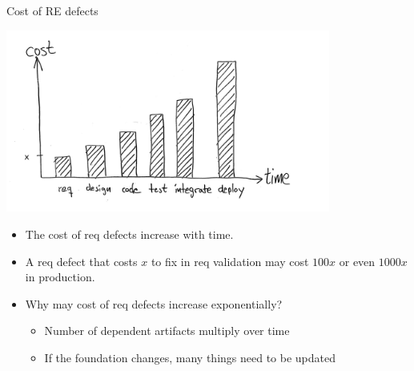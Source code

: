 \begin{Slide}{Cost of RE defects}
\begin{minipage}[t]{1.0\textwidth}
\vspace{-1.0em}\includegraphics[width=0.8\textwidth]{../img/cost-of-re-defect}
\end{minipage}
\vspace{-1em}
\begin{itemize}
\item The cost of req defects increase with time.
\item A req defect that costs $x$ to fix in req validation may cost $100x$ or even $1000x$ in production. 
\item Why may cost of req defects increase exponentially? 
\begin{itemize}
\item Number of dependent artifacts multiply over time
\item If the foundation changes, many things need to be updated

\end{itemize}
\end{itemize}
\end{Slide}